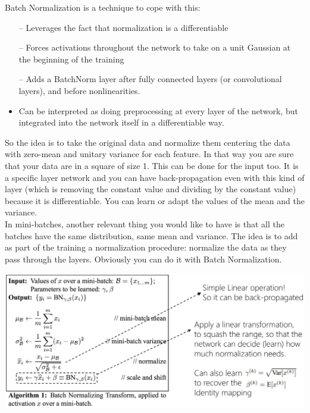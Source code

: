 Batch Normalization is a technique to cope with this:
\begin{itemize}
    \item[--] Leverages the fact that normalization is a differentiable
    \item[--] Forces activations throughout the network to take on a unit Gaussian at the beginning of the training
    \item[--] Adds a BatchNorm layer after fully connected layers (or convolutional layers), and before nonlinearities.
    \item Can be interpreted as doing preprocessing at every layer of the network, but integrated into the network itself in a differentiable way.
\end{itemize}{}

So the idea is to take the original data and normalize them centering the data with zero-mean and unitary variance for each feature. In that way you are sure that your data are in a square of size 1. This can be done for the input too. It is a specific layer network and you can have back-propagation even with this kind of layer  (which is removing the constant value and dividing by the constant value) because it is differentiable. You can learn or adapt the values of the mean and the variance. \\
In mini-batches, another relevant thing you would like to have is that all the batches have the same distribution, same mean and variance. The idea is to add as part of the training a normalization procedure: normalize the data as they pass through the layers. Obviously you can do it with Batch Normalization. \\

\vspace{0.2cm}
\begin{minipage}{\linewidth}
        \centering
        \includegraphics[width=14cm, height=6cm]{images/batch_norm.png}
\end{minipage}
\vspace{0.2cm}


